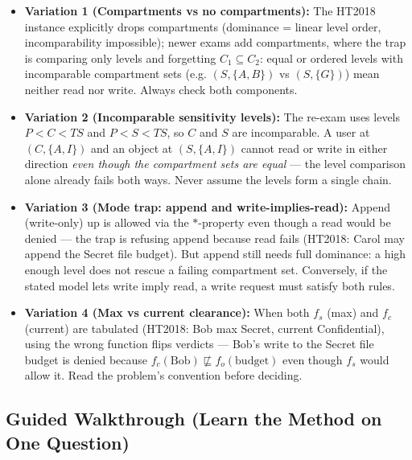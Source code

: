 \documentclass[12pt, a4paper]{article}
\begin{document}
\begin{trapbox}
\begin{itemize}
    \item \textbf{Variation 1 (Compartments vs no compartments):} The HT2018 instance explicitly drops compartments (dominance = linear level order, incomparability impossible); newer exams add compartments, where the trap is comparing only levels and forgetting $C_1 \subseteq C_2$: equal or ordered levels with incomparable compartment sets (e.g. $(S, \{A,B\})$ vs $(S, \{G\})$) mean neither read nor write. Always check both components.
    \item \textbf{Variation 2 (Incomparable sensitivity levels):} The re-exam uses levels $P < C < TS$ and $P < S < TS$, so $C$ and $S$ are incomparable. A user at $(C, \{A,I\})$ and an object at $(S, \{A,I\})$ cannot read or write in either direction \emph{even though the compartment sets are equal} --- the level comparison alone already fails both ways. Never assume the levels form a single chain.
    \item \textbf{Variation 3 (Mode trap: append and write-implies-read):} Append (write-only) up is allowed via the $*$-property even though a read would be denied --- the trap is refusing append because read fails (HT2018: Carol may append the Secret file budget).
    But append still needs full dominance: a high enough level does not rescue a failing compartment set. Conversely, if the stated model lets write imply read, a write request must satisfy both rules.
    \item \textbf{Variation 4 (Max vs current clearance):} When both $f_s$ (max) and $f_c$ (current) are tabulated (HT2018: Bob max Secret, current Confidential), using the wrong function flips verdicts --- Bob's write to the Secret file budget is denied because $f_c(\text{Bob}) \not\sqsubseteq f_o(\text{budget})$ even though $f_s$ would allow it. Read the problem's convention before deciding.
\end{itemize}
\end{trapbox}

\subsection*{Guided Walkthrough (Learn the Method on One Question)}
\end{document}
